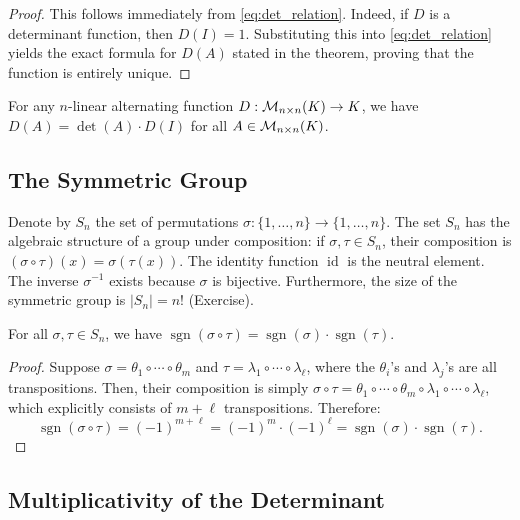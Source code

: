 \begin{proof}
  This follows immediately from \eqref{eq:det_relation}. Indeed, if $D$ is a determinant function, then $D(I) = 1$. Substituting this into \eqref{eq:det_relation} yields the exact formula for $D(A)$ stated in the theorem, proving that the function is entirely unique.
\end{proof}

\begin{corollary}
  \label{cor:det_pullout}
  For any $n$-linear alternating function $D : \mathcal{M}_{n \times n}(K) \to K$, we have $D(A) = \det(A) \cdot D(I)$ for all $A \in \mathcal{M}_{n \times n}(K)$.
\end{corollary}

\subsection{The Symmetric Group}

Denote by $S_n$ the set of permutations $\sigma : \{1, \dots, n\} \to \{1, \dots, n\}$. The set $S_n$ has the algebraic structure of a group under composition: if $\sigma, \tau \in S_n$, their composition is $(\sigma \circ \tau)(x) = \sigma(\tau(x))$. The identity function $\operatorname{id}$ is the neutral element. The inverse $\sigma^{-1}$ exists because $\sigma$ is bijective. Furthermore, the size of the symmetric group is $|S_n| = n!$ (Exercise).

\begin{lemma}
  \label{lem:sgn_multiplicative}
  For all $\sigma, \tau \in S_n$, we have $\operatorname{sgn}(\sigma \circ \tau) = \operatorname{sgn}(\sigma) \cdot \operatorname{sgn}(\tau)$.
\end{lemma}

\begin{proof}
  Suppose $\sigma = \theta_1 \circ \cdots \circ \theta_m$ and $\tau = \lambda_1 \circ \cdots \circ \lambda_{\ell}$, where the $\theta_i$'s and $\lambda_j$'s are all transpositions. Then, their composition is simply $\sigma \circ \tau = \theta_1 \circ \cdots \circ \theta_m \circ \lambda_1 \circ \cdots \circ \lambda_{\ell}$, which explicitly consists of $m + \ell$ transpositions. Therefore:
  \[
  \operatorname{sgn}(\sigma \circ \tau) = (-1)^{m+\ell} = (-1)^m \cdot (-1)^{\ell} = \operatorname{sgn}(\sigma) \cdot \operatorname{sgn}(\tau).
  \]
\end{proof}

\subsection{Multiplicativity of the Determinant}

